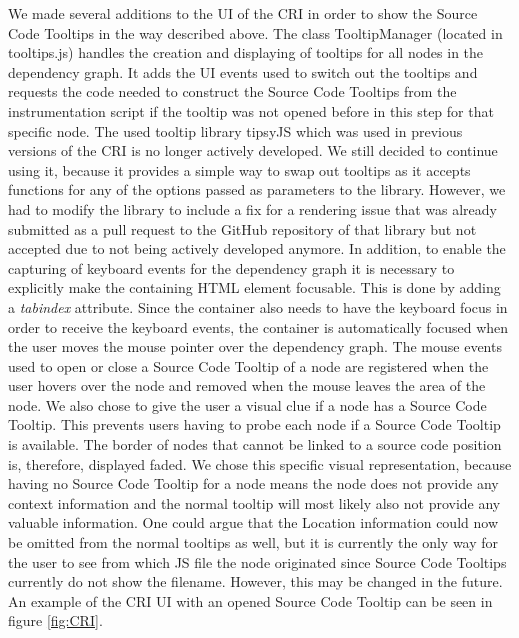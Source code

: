 We made several additions to the UI of the CRI in order to show the Source Code Tooltips in the way described above. The class TooltipManager (located in tooltips.js) handles the creation and displaying of tooltips for all nodes in the dependency graph. It adds the UI events used to switch out the tooltips and requests the code needed to construct the Source Code Tooltips from the instrumentation script if the tooltip was not opened before in this step for that specific node. The used tooltip library tipsyJS \cite{Tipsy} which was used in previous versions of the CRI is no longer actively developed. We still decided to continue using it, because it provides a simple way to swap out tooltips as it accepts functions for any of the options passed as parameters to the library. However, we had to modify the library to include a fix for a rendering issue that was already submitted as a pull request to the GitHub repository of that library but not accepted due to not being actively developed anymore. In addition, to enable the capturing of keyboard events for the dependency graph it is necessary to explicitly make the containing HTML element focusable. This is done by adding a \emph{tabindex} attribute. Since the container also needs to have the keyboard focus in order to receive the keyboard events, the container is automatically focused when the user moves the mouse pointer over the dependency graph. The mouse events used to open or close a Source Code Tooltip of a node are registered when the user hovers over the node and removed when the mouse leaves the area of the node. We also chose to give the user a visual clue if a node has a Source Code Tooltip. This prevents users having to probe each node if a Source Code Tooltip is available. The border of nodes that cannot be linked to a source code position is, therefore, displayed faded. We chose this specific visual representation, because having no Source Code Tooltip for a node means the node does not provide any context information and the normal tooltip will most likely also not provide any valuable information. One could argue that the Location information could now be omitted from the normal tooltips as well, but it is currently the only way for the user to see from which JS file the node originated since Source Code Tooltips currently do not show the filename. However, this may be changed in the future. An example of the CRI UI with an opened Source Code Tooltip can be seen in figure \ref{fig:CRI}.
	
